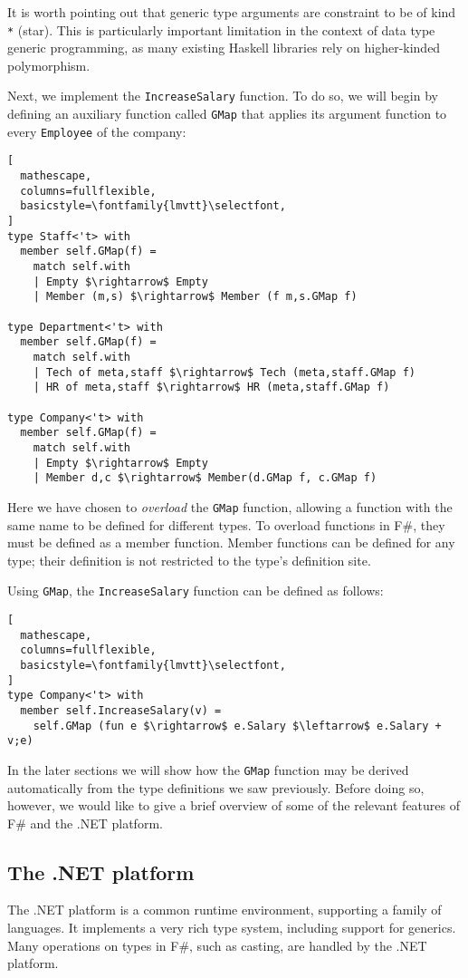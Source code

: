 \documentclass{sigplanconf}
\begin{document}
It is worth pointing out that generic type arguments are constraint to
be of kind \verb+*+ (star). This is particularly important limitation
in the context of data type generic programming, as many existing
Haskell libraries rely on higher-kinded polymorphism.

Next, we implement the \verb+IncreaseSalary+ function. To do so, we
will begin by defining an auxiliary function called \verb+GMap+ that
applies its argument function to every \verb+Employee+ of the company:
\begin{lstlisting}[
  mathescape,
  columns=fullflexible,
  basicstyle=\fontfamily{lmvtt}\selectfont,
]
type Staff<'t> with
  member self.GMap(f) = 
    match self.with
    | Empty $\rightarrow$ Empty
    | Member (m,s) $\rightarrow$ Member (f m,s.GMap f)

type Department<'t> with
  member self.GMap(f) =
    match self.with
    | Tech of meta,staff $\rightarrow$ Tech (meta,staff.GMap f)
    | HR of meta,staff $\rightarrow$ HR (meta,staff.GMap f)

type Company<'t> with
  member self.GMap(f) =
    match self.with
    | Empty $\rightarrow$ Empty
    | Member d,c $\rightarrow$ Member(d.GMap f, c.GMap f)
\end{lstlisting}
Here we have chosen to \emph{overload} the \verb+GMap+ function,
allowing a function with the same name to be defined for different
types. To overload functions in F\#, they must be defined as a member
function. Member functions can be defined for any type; their
definition is not restricted to the type's definition site. 

Using \verb+GMap+,  the \verb+IncreaseSalary+ function can be defined as follows:
\begin{lstlisting}[
  mathescape,
  columns=fullflexible,
  basicstyle=\fontfamily{lmvtt}\selectfont,
]
type Company<'t> with
  member self.IncreaseSalary(v) =
    self.GMap (fun e $\rightarrow$ e.Salary $\leftarrow$ e.Salary + v;e)
\end{lstlisting}

In the later sections we will show how the \verb+GMap+ function may be
derived automatically from the type definitions we saw
previously. Before doing so, however, we would like to give a brief
overview of some of the relevant features of F\# and the .NET
platform.

\subsection{The .NET platform}
The .NET platform is a common runtime environment, supporting
a family of languages. It implements a very rich type
system, including support for generics. Many operations on types
in F\#, such as casting, are handled by the .NET platform. 
\end{document}

